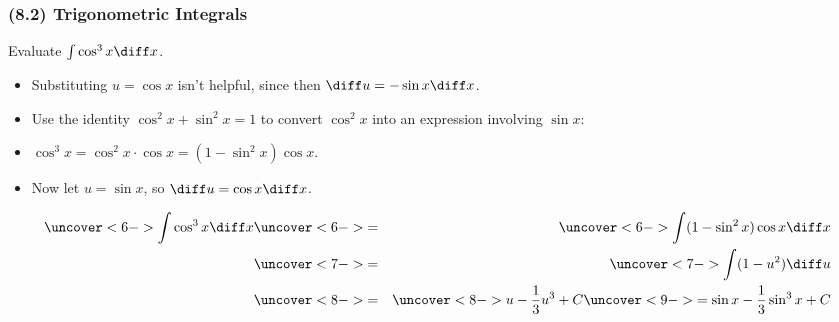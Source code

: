 \begin{frame}
\frametitle{(8.2) Trigonometric Integrals}
\begin{example}[Example 1, p. 496]
Evaluate $\int \cos^3 x \diff x$.
\begin{itemize}
\item<2->  Substituting $u =\cos x$ isn't helpful, since then $\diff u = -\sin x \diff x$.
\item<3->  Use the identity $\cos^2 x + \sin^2 x = 1$ to convert $\cos^2 x$ into an expression involving $\sin x$:
\item<4-| alert@6>  $\cos^3 x = \cos^2 x \cdot \cos x = (1 - \sin^2 x)\cos x$.
\item<5-| alert@7>  Now let $u = \sin x$, so $\diff u = \cos x \diff x$.
\end{itemize}
\abovedisplayskip=0pt
\belowdisplayskip=0pt
\begin{eqnarray*}
\uncover<6->{%
\int \cos^3 x \diff x 
}%
& \uncover<6->{ = } &%
\uncover<6->{%
\int (1-\sin^2 x)\cos x\diff x
}\\%
& \uncover<7->{ = } &%
\uncover<7->{%
\int (1-u^2)\diff u
}\\%
& \uncover<8->{ = } &%
\uncover<8->{%
u - \frac{1}{3}u^3 + C
}%
\uncover<9->{%
 = \sin x - \frac{1}{3}\sin^3 x + C
}%
\end{eqnarray*}
\end{example}
\end{frame}

